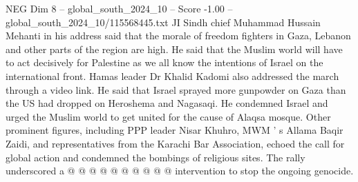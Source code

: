 \begin{textsample}{NEG Dim 8 – global\_south\_2024\_10 – Score -1.00 – global\_south\_2024\_10/115568445.txt}
JI Sindh chief Muhammad Hussain Mehanti in his address said that the morale of freedom fighters in Gaza, Lebanon and other parts of the region are high.
He said that the Muslim world will have to act decisively for Palestine as we all know the intentions of Israel on the international front.
Hamas leader Dr Khalid Kadomi also addressed the march through a video link.
He said that Israel sprayed more gunpowder on Gaza than the US had dropped on Heroshema and Nagasaqi.
He condemned Israel and urged the Muslim world to get united for the cause of Alaqsa mosque.
Other prominent figures, including PPP leader Nisar Khuhro, MWM ' s Allama Baqir Zaidi, and representatives from the Karachi Bar Association, echoed the call for global action and condemned the bombings of religious sites.
The rally underscored a @ @ @ @ @ @ @ @ @ @ intervention to stop the ongoing genocide.

\end{textsample}
